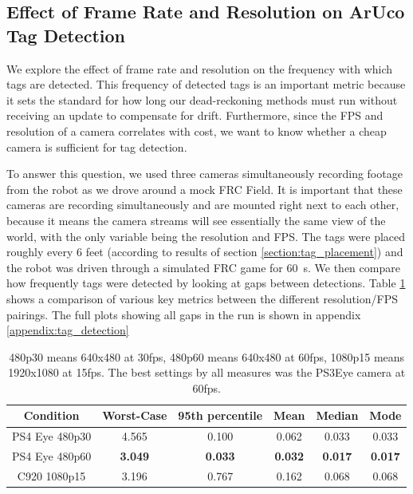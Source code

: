 \documentclass{article}
\begin{document}
	\subsection{Effect of Frame Rate and Resolution on ArUco Tag Detection}

    We explore the effect of frame rate and resolution on the frequency with which tags are detected. This frequency of detected tags is an important metric because it sets the standard for how long our dead-reckoning methods must run without receiving an update to compensate for drift. Furthermore, since the FPS and resolution of a camera correlates with cost, we want to know whether a cheap camera is sufficient for tag detection.

    To answer this question, we used three cameras simultaneously recording footage from the robot as we drove around a mock FRC Field. It is important that these cameras are recording simultaneously and are mounted right next to each other, because it means the camera streams will see essentially the same view of the world, with the only variable being the resolution and FPS. The tags were placed roughly every 6 feet (according to results of section \ref{section:tag_placement}) and the robot was driven through a simulated FRC game for \SI{60}{\second}. We then compare how frequently tags were detected by looking at gaps between detections. Table \ref{table:tag_detection_comparison} shows a comparison of various key metrics between the different resolution/FPS pairings. The full plots showing all gaps in the run is shown in appendix \ref{appendix:tag_detection}

    \begin{table}[H]
      \centering
      \begin{tabular}{|c|c|c|c|c|c|} \hline
        Condition & Worst-Case & 95th percentile & Mean & Median & Mode \\ \hline
        PS4 Eye 480p30 & 4.565 & 0.100 & 0.062 & 0.033 & 0.033 \\ \hline
        PS4 Eye 480p60 & \textbf{3.049} & \textbf{0.033} & \textbf{0.032} & \textbf{0.017} & \textbf{0.017} \\ \hline
        C920 1080p15 & 3.196 & 0.767 & 0.162 & 0.068 & 0.068 \\ \hline
      \end{tabular}
      \caption{480p30 means 640x480 at 30fps, 480p60 means 640x480 at 60fps, 1080p15 means 1920x1080 at 15fps. The best settings by all measures was the PS3Eye camera at 60fps.}
      \label{table:tag_detection_comparison}
    \end{table}
\end{document}
